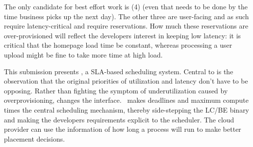 The only candidate for best effort work is (4) (even that needs to be done by
the time business picks up the next day). The other three are user-facing and as
such require latency-critical and require reservations. How much these
reservations are over-provisioned will reflect the developers interest in
keeping low latency: it is critical that the homepage load time be constant,
whereas processing a user upload might be fine to take more time at high load.

This submission presents \textit{\sysname}, a SLA-based scheduling system.
Central to \sysname{} is the observation that the original priorities of
utilization and latency don't have to be opposing. Rather than fighting the
symptom of underutilization caused by overprovisioning, \sysname{} changes the
interface.\ \sysname{} makes deadlines and maximum compute times the central
scheduling mechanism, thereby side-stepping the LC/BE binary and making the
developers requirements explicit to the scheduler. The cloud provider can use
the information of how long a process will run to make better placement
decisions.
